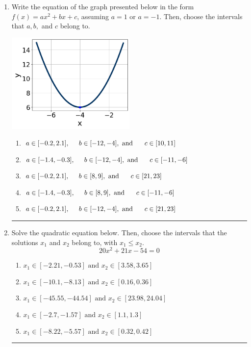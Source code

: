 \documentclass[14pt]{extbook}
\newcommand{\litem}[1]{\item#1\hspace*{-1cm}\rule{\textwidth}{0.4pt}}
\begin{document}
\begin{enumerate}
{\begin{enumerate}[label=\Alph*.]
\end{enumerate} }
\litem{
Write the equation of the graph presented below in the form $f(x)=ax^2+bx+c$, assuming  $a=1$ or $a=-1$. Then, choose the intervals that $a, b,$ and $c$ belong to.
\begin{center}
    \includegraphics[width=0.5\textwidth]{../Figures/quadraticGraphToEquationC.png}
\end{center}
\begin{enumerate}[label=\Alph*.]
\item \( a \in [-0.2, 2.1], \hspace*{5mm} b \in [-12, -4], \text{ and } \hspace*{5mm} c \in [10, 11] \)
\item \( a \in [-1.4, -0.3], \hspace*{5mm} b \in [-12, -4], \text{ and } \hspace*{5mm} c \in [-11, -6] \)
\item \( a \in [-0.2, 2.1], \hspace*{5mm} b \in [8, 9], \text{ and } \hspace*{5mm} c \in [21, 23] \)
\item \( a \in [-1.4, -0.3], \hspace*{5mm} b \in [8, 9], \text{ and } \hspace*{5mm} c \in [-11, -6] \)
\item \( a \in [-0.2, 2.1], \hspace*{5mm} b \in [-12, -4], \text{ and } \hspace*{5mm} c \in [21, 23] \)

\end{enumerate} }
\litem{
Solve the quadratic equation below. Then, choose the intervals that the solutions $x_1$ and $x_2$ belong to, with $x_1 \leq x_2$.\[ 20x^{2} +21 x -54 = 0 \]\begin{enumerate}[label=\Alph*.]
\item \( x_1 \in [-2.21, -0.53] \text{ and } x_2 \in [3.58, 3.65] \)
\item \( x_1 \in [-10.1, -8.13] \text{ and } x_2 \in [0.16, 0.36] \)
\item \( x_1 \in [-45.55, -44.54] \text{ and } x_2 \in [23.98, 24.04] \)
\item \( x_1 \in [-2.7, -1.57] \text{ and } x_2 \in [1.1, 1.3] \)
\item \( x_1 \in [-8.22, -5.57] \text{ and } x_2 \in [0.32, 0.42] \)


\end{enumerate}}
\end{enumerate}
\end{document}
